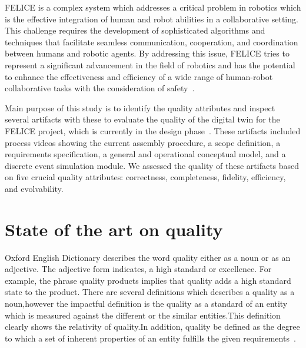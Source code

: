 \documentclass{llncs}
\begin{document}
    FELICE is a complex system which  addresses a critical problem in robotics which is the effective integration of human and robot abilities in a collaborative setting. 
    This challenge requires the development of sophisticated algorithms and techniques that facilitate seamless communication, cooperation, and coordination between humans and robotic agents. 
    By addressing this issue, FELICE tries to represent a significant advancement in the field of robotics and has the potential to enhance the effectiveness and efficiency of a wide range of 
    human-robot collaborative tasks with the consideration of safety~\cite{FELICE}.

    Main purpose of this study is to identify the quality attributes and inspect several artifacts 
    with these to evaluate the quality of the digital twin for the FELICE project, 
    which is currently in the design phase~\cite{FELICE}. These artifacts included process videos showing the current 
    assembly procedure, a scope definition, a requirements specification, a general and operational conceptual model, 
    and a discrete event simulation module. We assessed the quality of these artifacts based on five crucial quality attributes: correctness, completeness, fidelity, efficiency, and evolvability.




    \section{State of the art on quality}
    Oxford English Dictionary describes the word quality  either as a noun or as an adjective. 
    The adjective form indicates, a high standard or excellence. For example, the phrase quality products implies 
    that quality adds a high standard state to the product. There are several definitions which describes a quality 
    as a noun,however the impactful definition is the quality as a standard of an entity which is measured against the 
    different or the similar entities\cite{OxfordDictionary}.This definition clearly shows the relativity of quality.In addition, quality be defined 
    as the degree to which a set of inherent properties of an entity fulfills the given requirements~\cite{ISO9000}.    
\end{document}
